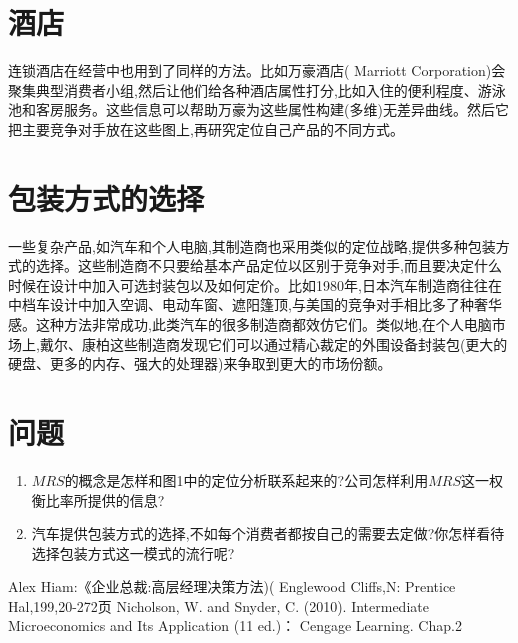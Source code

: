 \documentclass[10pt, a4paper]{ctexart} %
\begin{document}
\section*{酒店}
连锁酒店在经营中也用到了同样的方法。比如万豪酒店( Marriott Corporation)会聚集典型消费者小组\cite{ref1},然后让他们给各种酒店属性打分,比如入住的便利程度、游泳池和客房服务。这些信息可以帮助万豪为这些属性构建(多维)无差异曲线。然后它把主要竞争对手放在这些图上,再研究定位自己产品的不同方式。

\section*{包装方式的选择}
一些复杂产品,如汽车和个人电脑,其制造商也采用类似的定位战略,提供多种包装方式的选择。这些制造商不只要给基本产品定位以区别于竞争对手,而且要决定什么时候在设计中加入可选封装包以及如何定价。比如1980年,日本汽车制造商往往在中档车设计中加入空调、电动车窗、遮阳篷顶,与美国的竞争对手相比多了种奢华感。这种方法非常成功,此类汽车的很多制造商都效仿它们。类似地,在个人电脑市场上,戴尔、康柏这些制造商发现它们可以通过精心裁定的外围设备封装包(更大的硬盘、更多的内存、强大的处理器)来争取到更大的市场份额。

\section*{问题}
\begin{enumerate}
	\item $MRS$的概念是怎样和图1中的定位分析联系起来的?公司怎样利用$MRS$这一权衡比率所提供的信息?
	\item 汽车提供包装方式的选择,不如每个消费者都按自己的需要去定做?你怎样看待选择包装方式这一模式的流行呢?
\end{enumerate}




\small
\begin{thebibliography}{99}
	\setlength{\parskip}{0pt} %
	  Alex Hiam:《企业总裁:高层经理决策方法)( Englewood Cliffs,N: Prentice Hal,199,20-272页
	 Nicholson, W. and Snyder, C. (2010). Intermediate Microeconomics and Its Application (11 ed.)： Cengage Learning. Chap.2
	\end {thebibliography}
\end{document}
